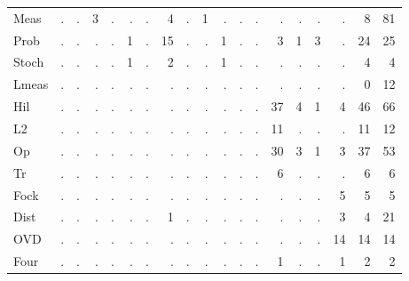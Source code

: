 {\begin{longtable}{l r r r r r r r r r r r r r r r r r r}
\textsf{Meas} & . & . & 3 & . & . & . & 4 & . & 1 & . & . & . & . & . & . & . & 8 & 81 \\
\textsf{Prob} & . & . & . & . & 1 & . & 15 & . & . & 1 & . & . & 3 & 1 & 3 & . & 24 & 25 \\
\textsf{Stoch} & . & . & . & . & 1 & . & 2 & . & . & 1 & . & . & . & . & . & . & 4 & 4 \\
\textsf{Lmeas} & . & . & . & . & . & . & . & . & . & . & . & . & . & . & . & . & 0 & 12 \\
\textsf{Hil} & . & . & . & . & . & . & . & . & . & . & . & . & 37 & 4 & 1 & 4 & 46 & 66 \\
\textsf{L2} & . & . & . & . & . & . & . & . & . & . & . & . & 11 & . & . & . & 11 & 12 \\
\textsf{Op} & . & . & . & . & . & . & . & . & . & . & . & . & 30 & 3 & 1 & 3 & 37 & 53 \\
\textsf{Tr} & . & . & . & . & . & . & . & . & . & . & . & . & 6 & . & . & . & 6 & 6 \\
\textsf{Fock} & . & . & . & . & . & . & . & . & . & . & . & . & . & . & . & 5 & 5 & 5 \\
\textsf{Dist} & . & . & . & . & . & . & 1 & . & . & . & . & . & . & . & . & 3 & 4 & 21 \\
\textsf{OVD} & . & . & . & . & . & . & . & . & . & . & . & . & . & . & . & 14 & 14 & 14 \\
\textsf{Four} & . & . & . & . & . & . & . & . & . & . & . & . & 1 & . & . & 1 & 2 & 2 \\
\end{longtable}
}
